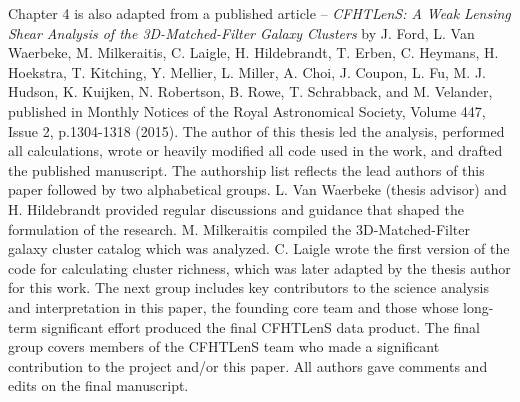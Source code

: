 Chapter 4 is also adapted from a published article -- {\it CFHTLenS: A Weak Lensing Shear Analysis of the 3D-Matched-Filter Galaxy Clusters} by J. Ford, L. Van Waerbeke, M. Milkeraitis, C. Laigle, H. Hildebrandt, T. Erben, C. Heymans, H. Hoekstra, T. Kitching, Y. Mellier, L. Miller, A. Choi, J. Coupon, L. Fu, M. J. Hudson, K. Kuijken, N. Robertson, B. Rowe, T. Schrabback, and M. Velander, published in Monthly Notices of the Royal Astronomical Society, Volume 447, Issue 2, p.1304-1318 (2015). The author of this thesis led the analysis, performed all calculations, wrote or heavily modified all code used in the work, and drafted the published manuscript. The authorship list reflects the lead authors of this paper followed by two alphabetical groups. L. Van Waerbeke (thesis advisor) and H. Hildebrandt provided regular discussions and guidance that shaped the formulation of the research. M. Milkeraitis compiled the 3D-Matched-Filter galaxy cluster catalog which was analyzed. C. Laigle wrote the first version of the code for calculating cluster richness, which was later adapted by the thesis author for this work. The next group includes key contributors to the science analysis and interpretation in this paper, the founding core team and those whose long-term significant effort produced the final CFHTLenS data product. The final group covers members of the CFHTLenS team who made a significant contribution to the project and/or this paper. All authors gave comments and edits on the final manuscript.


